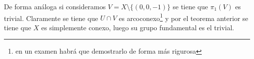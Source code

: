 \begin{ejemplo}
\begin{enumerate}
\begin{figure}[H]
        \end{figure}
        
        De forma análoga si consideramos $V=X\setminus \{(0,0,-1)\}$ se tiene que $\pi_1(V)$ es trivial. Claramente se tiene que $U\cap V$ es arcoconexo\footnote{en un examen habrá que demostrarlo de forma más rigurosa} y por el teorema anterior se tiene que $X$ es simplemente conexo, luego su grupo fundamental es el trivial.
    \end{enumerate}
\end{ejemplo}

